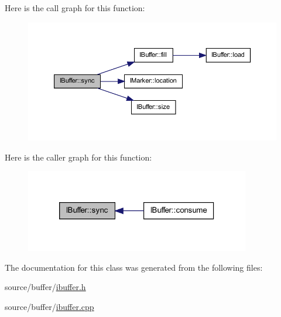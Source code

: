 Here is the call graph for this function:\nopagebreak
\begin{figure}[H]
\begin{center}
\leavevmode
\includegraphics[width=382pt]{class_i_buffer_aa61fe968b6058c01883bf4a464e7089f_cgraph}
\end{center}
\end{figure}




Here is the caller graph for this function:\nopagebreak
\begin{figure}[H]
\begin{center}
\leavevmode
\includegraphics[width=278pt]{class_i_buffer_aa61fe968b6058c01883bf4a464e7089f_icgraph}
\end{center}
\end{figure}




The documentation for this class was generated from the following files:\begin{DoxyCompactItemize}
\item 
source/buffer/\hyperlink{ibuffer_8h}{ibuffer.h}\item 
source/buffer/\hyperlink{ibuffer_8cpp}{ibuffer.cpp}\end{DoxyCompactItemize}

